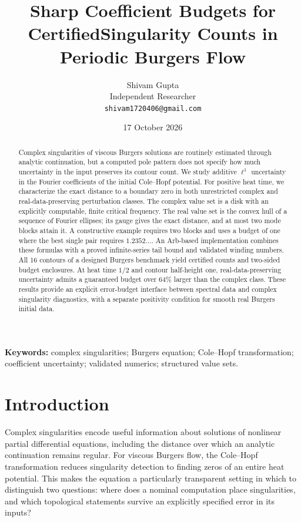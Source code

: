 \documentclass[11pt]{article}
\title{Sharp Coefficient Budgets for Certified\newline Singularity Counts in Periodic Burgers Flow}
\author{Shivam Gupta\\Independent Researcher\\\texttt{shivam1720406@gmail.com}}
\date{17 October 2026}
\begin{document}
\maketitle
\begin{abstract}
Complex singularities of viscous Burgers solutions are routinely estimated through analytic continuation, but a computed pole pattern does not specify how much uncertainty in the input preserves its contour count. We study additive $\ell^1$ uncertainty in the Fourier coefficients of the initial Cole--Hopf potential. For positive heat time, we characterize the exact distance to a boundary zero in both unrestricted complex and real-data-preserving perturbation classes. The complex value set is a disk with an explicitly computable, finite critical frequency. The real value set is the convex hull of a sequence of Fourier ellipses; its gauge gives the exact distance, and at most two mode blocks attain it. A constructive example requires two blocks and uses a budget of one where the best single pair requires $1.2352\ldots$. An Arb-based implementation combines these formulas with a proved infinite-series tail bound and validated winding numbers. All 16 contours of a designed Burgers benchmark yield certified counts and two-sided budget enclosures. At heat time $1/2$ and contour half-height one, real-data-preserving uncertainty admits a guaranteed budget over 64\% larger than the complex class. These results provide an explicit error-budget interface between spectral data and complex singularity diagnostics, with a separate positivity condition for smooth real Burgers initial data.
\end{abstract}
\noindent\textbf{Keywords:} complex singularities; Burgers equation; Cole--Hopf transformation; coefficient uncertainty; validated numerics; structured value sets.

\section{Introduction}
Complex singularities encode useful information about solutions of nonlinear partial differential equations, including the distance over which an analytic continuation remains regular. For viscous Burgers flow, the Cole--Hopf transformation reduces singularity detection to finding zeros of an entire heat potential. This makes the equation a particularly transparent setting in which to distinguish two questions: where does a nominal computation place singularities, and which topological statements survive an explicitly specified error in its inputs?
\end{document}
